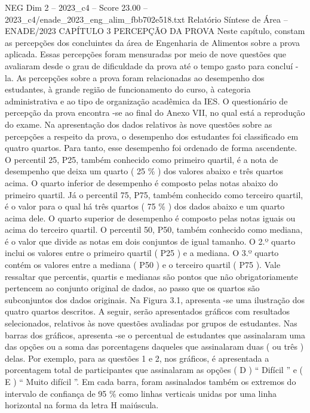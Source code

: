 \begin{textsample}{NEG Dim 2 – 2023\_c4 – Score 23.00 – 2023\_c4/enade\_2023\_eng\_alim\_fbb702e518.txt}  \label{ex:f2_neg_422}
Relatório Síntese de Área – ENADE/2023 CAPÍTULO 3 PERCEPÇÃO DA PROVA Neste capítulo, constam as percepções dos concluintes da área de Engenharia de Alimentos sobre a prova aplicada.
Essas percepções foram mensuradas por meio de nove questões que avaliaram desde o grau de dificuldade da prova até o tempo gasto para concluí -la.
As percepções sobre a prova foram relacionadas ao desempenho dos estudantes, à grande região de funcionamento do curso, à categoria administrativa e ao tipo de organização acadêmica da IES.
O questionário de percepção da prova encontra -se ao final do Anexo VII, no qual está a reprodução do exame.
Na apresentação dos dados relativos às nove questões sobre as percepções a respeito da prova, o desempenho dos estudantes foi classificado em quatro quartos.
Para tanto, esse desempenho foi ordenado de forma ascendente.
O percentil 25, P25, também conhecido como primeiro quartil, é a nota de desempenho que deixa um quarto ( 25 \% ) dos valores abaixo e três quartos acima.
O quarto inferior de desempenho é composto pelas notas abaixo do primeiro quartil.
Já o percentil 75, P75, também conhecido como terceiro quartil, é o valor para o qual há três quartos ( 75 \% ) dos dados abaixo e um quarto acima dele.
O quarto superior de desempenho é composto pelas notas iguais ou acima do terceiro quartil.
O percentil 50, P50, também conhecido como mediana, é o valor que divide as notas em dois conjuntos de igual tamanho.
O 2.º quarto inclui os valores entre o primeiro quartil ( P25 ) e a mediana.
O 3.º quarto contém os valores entre a mediana ( P50 ) e o terceiro quartil ( P75 ).
Vale ressaltar que percentis, quartis e medianas são pontos que não obrigatoriamente pertencem ao conjunto original de dados, ao passo que os quartos são subconjuntos dos dados originais.
Na Figura 3.1, apresenta -se uma ilustração dos quatro quartos descritos.
A seguir, serão apresentados gráficos com resultados selecionados, relativos às nove questões avaliadas por grupos de estudantes.
Nas barras dos gráficos, apresenta -se o percentual de estudantes que assinalaram uma das opções ou a soma das porcentagens daqueles que assinalaram duas ( ou três ) delas.
Por exemplo, para as questões 1 e 2, nos gráficos, é apresentada a porcentagem total de participantes que assinalaram as opções ( D ) “ Difícil ” e ( E ) “ Muito difícil ”.
Em cada barra, foram assinalados também os extremos do intervalo de confiança de 95 \% como linhas verticais unidas por uma linha horizontal na forma da letra H maiúscula.

\end{textsample}
